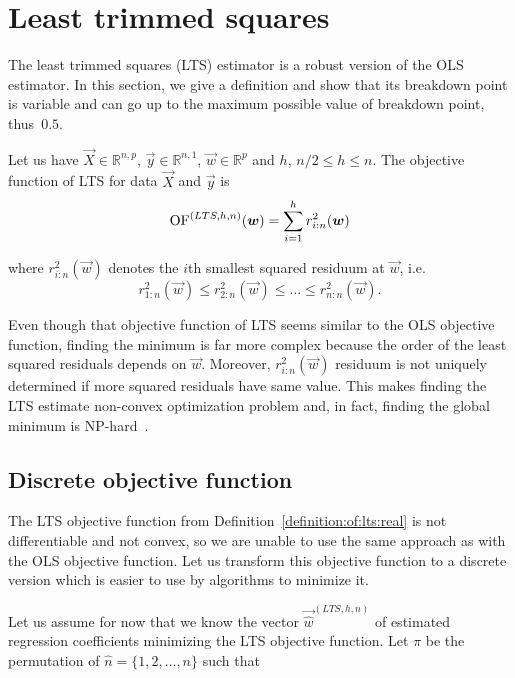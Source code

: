 \section{Least trimmed squares}
The least trimmed squares (LTS) estimator is a robust version of the OLS estimator. In this section, we give a definition and show that its breakdown point is variable and can go up to the maximum possible value of breakdown point, thus~$0.5$.

\begin{definition} \label{definition:of:lts:real}
Let us have $\vec{X} \in \mathbb{R}^{n,p}$, $\vec{y} \in \mathbb{R}^{n,1}$, 
    $\vec{w} \in \mathbb{R}^p$ and $h$, $ n/2 \leq h \leq n$. The objective function of LTS for data $\vec{X}$ and $\vec{y}$ is
    \begin{equation}  
        \operatorname{OF}^{(LTS,h, n)}(\boldsymbol{w}) =  \sum\limits_{i=1}^h r_{i:n}^2(\boldsymbol{w})  
    \end{equation}
\end{definition}
where $r_{i:n}^2(\vec{w})$ denotes the $i$th smallest squared residuum at $\vec{w}$, i.e. 
\begin{equation}
    r_{1:n}^2(\vec{w}) \leq r_{2:n}^2(\vec{w}) \leq \ldots \leq r_{n:n}^2(\vec{w}).   
\end{equation} 

Even though that objective function of LTS seems similar to the OLS objective function, finding the minimum is far more complex because the order of the least squared residuals depends on $\vec{w}$. Moreover, $r_{i:n}^2(\vec{w})$ residuum is not uniquely determined if more squared residuals have same value. This makes finding the LTS estimate non-convex optimization problem and, in fact, finding the global minimum is NP-hard~\cite{bernholt2006robust}. 

\subsection{Discrete objective function} \label{sectionofltsdiscrete}
The LTS objective function from Definition~\ref{definition:of:lts:real} is not differentiable and not convex, so we are unable to use the same approach as with the OLS objective function. Let us transform this objective function to a discrete version which is easier to use by algorithms to minimize it.

Let us assume for now that we know the vector $\vec{\hat{w}}^{(LTS,h, n)}$ of estimated regression coefficients minimizing the LTS objective function. Let $\pi$ be the permutation of $\hat{n} = \{{1,2,\ldots, n\}}$ such that 

